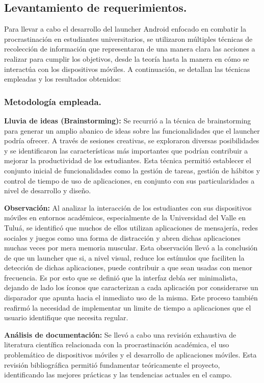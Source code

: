 \subsection{Levantamiento de requerimientos.}

Para llevar a cabo el desarrollo del launcher Android enfocado en combatir la procrastinación en estudiantes universitarios, se utilizaron múltiples técnicas de recolección de información que representaran de una manera clara las acciones a realizar para cumplir los objetivos, desde la teoría hasta la manera en cómo se interactúa con los dispositivos móviles. A continuación, se detallan las técnicas empleadas y los resultados obtenidos:

\subsubsection{Metodología empleada.}

\textbf{Lluvia de ideas (Brainstorming):} Se recurrió a la técnica de brainstorming para generar un amplio abanico de ideas sobre las funcionalidades que el launcher podría ofrecer. A través de sesiones creativas, se exploraron diversas posibilidades y se identificaron las características más importantes que podrían contribuir a mejorar la productividad de los estudiantes. Esta técnica permitió establecer el conjunto inicial de funcionalidades como la gestión de tareas, gestión de hábitos y control de tiempo de uso de aplicaciones, en conjunto con sus particularidades a nivel de desarrollo y diseño.

\textbf{Observación:} Al analizar la interacción de los estudiantes con sus dispositivos móviles en entornos académicos, especialmente de la Universidad del Valle en Tuluá, se identificó que muchos de ellos utilizan aplicaciones de mensajería, redes sociales y juegos como una forma de distracción y abren dichas aplicaciones muchas veces por mera memoria muscular. Esta observación llevó a la conclusión de que un launcher que si, a nivel visual, reduce los estímulos que faciliten la detección de dichas aplicaciones, puede contribuir a que sean usadas con menor frecuencia. Es por esto que se definió que la interfaz debía ser minimalista, dejando de lado los íconos que caracterizan a cada aplicación por considerarse un disparador que apunta hacia el inmediato uso de la misma. Este proceso también reafirmó la necesidad de implementar un limite de tiempo a aplicaciones que el usuario identifique que necesita regular.

\textbf{Análisis de documentación:} Se llevó a cabo una revisión exhaustiva de literatura científica relacionada con la procrastinación académica, el uso problemático de dispositivos móviles y el desarrollo de aplicaciones móviles. Esta revisión bibliográfica permitió fundamentar teóricamente el proyecto, identificando las mejores prácticas y las tendencias actuales en el campo.

